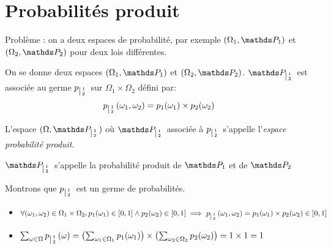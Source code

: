 \section{Probabilités produit}
  Problème : on a deux espaces de probabilité, par exemple
  $(\Omega_1, \PP_1)$ et $(\Omega_2, \PP_2)$ pour deux lois différentes.

  \begin{definition}
    On se donne deux espaces $(\Omega_1, \PP_1)$ et $(\Omega_2, \PP_2)$.
    $\PP_{\left|{1\atop 2}\right.}$ est associée au germe
    $p_{\left|{1\atop 2}\right.}$ sur $\Omega_1\times\Omega_2$ défini par: \[
      p_{\left|{1\atop 2}\right.}(\omega_1,\omega_2)=p_1(\omega_1)\times p_2(\omega_2)
    \]

    L'espace $(\Omega, \PP_{\left|{1\atop 2}\right.})$ où
    $\PP_{\left|{1\atop 2}\right.}$ associée à $p_{\left|{1\atop 2}\right.}$
    s'appelle l'\emph{espace probabilité produit}.

    $\PP_{\left|{1\atop 2}\right.}$ s'appelle la probabilité produit de $\PP_1$ et de $\PP_2$
  \end{definition}

  \begin{preuve}
    Montrons que $p_{\left|{1\atop 2}\right.}$ est un germe de probabilités.

    \begin{itemize}
      \item $\forall (\omega_1,\omega_2) \in \Omega_1\times\Omega_2,
             p_1(\omega_1) \in [0,1] \wedge p_2(\omega_2) \in [0,1]
             \implies p_{\left|{1\atop 2}\right.}(\omega_1,\omega_2)
             =p_1(\omega_1)\times p_2(\omega_2) \in [0,1]$

      \item $\sum_{\omega\in\Omega} p_{\left|{1\atop 2}\right.}(\omega)
            =\left(\sum_{\omega_1\in\Omega_1}p_1(\omega_1)\right)\times
             \left(\sum_{\omega_2\in\Omega_2}p_2(\omega_2)\right) = 1\times 1 = 1$
    \end{itemize}
  \end{preuve}
